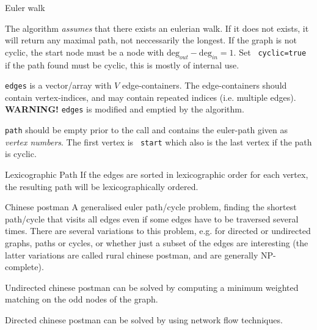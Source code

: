 
\begin{algorithm}{Euler walk}

\desc
The algorithm \emph{assumes} that there exists an eulerian walk. If it
does not exists, it will return any maximal path, not neccessarily the
longest.  If the graph is not cyclic, the start node must be a node
with $\mathrm{deg}_{out}-\mathrm{deg}_{in} = 1$.  Set {\tt
cyclic=true} if the path found must be cyclic, this is mostly of
internal use.

{\tt edges} is a vector/array with $V$ edge-containers. The
edge-containers should contain vertex-indices, and may contain
repeated indices (i.e. multiple edges). {\bf WARNING!} {\tt edges} is
modified and emptied by the algorithm.

{\tt path} should be empty prior to the call and contains the
euler-path given as \emph{vertex numbers}. The first vertex is {\tt
start} which also is the last vertex if the path is cyclic.

\item[Lexicographic Path] If the edges are sorted in lexicographic order for
each vertex, the resulting path will be lexicographically
ordered. 
\end{algorithm}


\begin{algorithm}{Chinese postman}
\desc
A generalised euler path/cycle problem, finding the shortest
path/cycle that visits all edges even if some edges have to be
traversed several times.  There are several variations to this
problem, e.g. for directed or undirected graphs, paths or cycles, or
whether just a subset of the edges are interesting (the latter
variations are called rural chinese postman, and are generally
NP-complete).

Undirected chinese postman can be solved by computing a minimum
weighted matching on the odd nodes of the graph.%

Directed chinese postman can be solved by using network flow
techniques.%
\end{algorithm}

